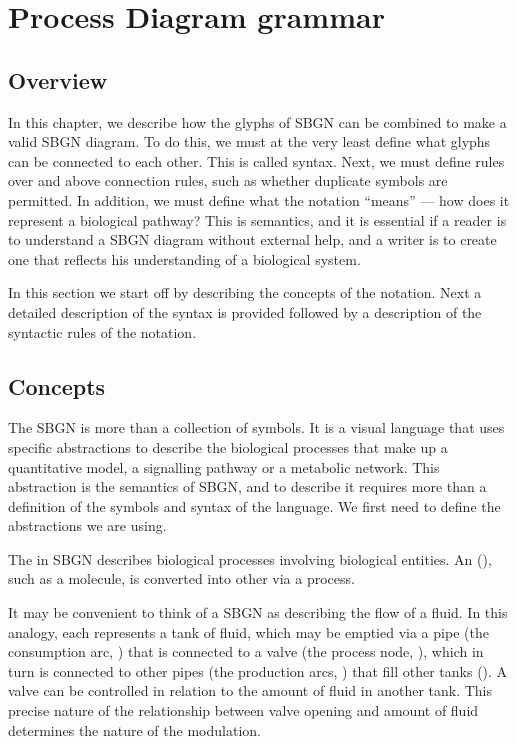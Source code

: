 \chapter{Process Diagram grammar}
\label{chp:grammar}

\section{Overview}

In this chapter, we describe how the glyphs of SBGN can be combined
to make a valid SBGN diagram. To do this, we must at the very least
define what glyphs can be connected to each other. This is called
syntax. Next, we must define rules over and above connection rules,
such as whether duplicate symbols are permitted. In addition, we must define what the notation ``means'' --- how does it represent a biological pathway? This is semantics, and it is essential if a reader is to understand a SBGN diagram without external help, and a writer is to create one that reflects his understanding of a biological system.

In this section we start off by describing the concepts of the
\PD{} notation. Next a detailed description of the syntax is provided
followed by a description of the syntactic rules of the notation.

\section{Concepts}

The SBGN \PD{} is more than a collection of symbols. It is a
visual language that uses specific abstractions to describe the
biological processes that make up a quantitative model, a signalling pathway or a metabolic network. This abstraction is the
semantics of SBGN, and to describe it requires more than a definition
of the symbols and syntax of the language. We first need to define the
abstractions we are using.

The \PD{} in SBGN describes biological processes involving biological entities. An  (), such as a molecule, is converted into other  via a process. 

It may be convenient to think of a SBGN \PD{} as describing the
flow of a fluid. In this analogy, each  represents a
tank of fluid, which may be emptied via a pipe (the consumption arc, ) 
that is connected to a valve (the process node, ), which in turn is
connected to other pipes (the production arcs, ) that fill other tanks
(). A valve can be
controlled in relation to the amount of fluid in another tank.  This
precise nature of the relationship between valve opening and amount of
fluid determines the nature of the modulation.

